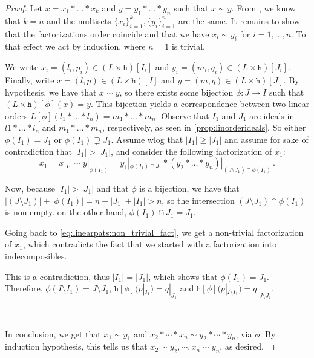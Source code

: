 \documentclass[12pt, reqno]{amsart}
\theoremstyle{definition}
\begin{document}
\begin{proof}
Let $x = x_1 \ast \dots \ast x_k $ and $ y =  y_1 \ast \dots \ast y_n$ such that $x \sim y$.
From \cite[Corollary 3.4.]{Penaguiao2020}, we know that $k = n$ and the multisets $\{x_i\}_{i=1}^k,  \{y_i\}_{i=1}^n$ are the same.
It remains to show that the factorizations order coincide and that we have $x_i \sim y_i$ for $i = 1, \dots , n$.
To that effect we act by induction, where $n = 1$ is trivial.


We write $x_i = (l_i, p_i)\in (L\times \mathtt{h})[I_i]$ and $y_i = (m_i, q_i)\in (L\times \mathtt{h})[J_i]$.
Finally, write $x = (l, p) \in (L\times \mathtt{h})[I] $ and $y = (m, q) \in (L\times \mathtt{h})[J]$.
By hypothesis, we have that $x \sim y$, so there exists some bijection $\phi: J \to I$ such that $ (L\times \mathtt{h})[\phi](x) = y$.
This bijection yields a correspondence between two linear orders $L [\phi] (l_1 \ast \dots \ast l_n) = m_1\ast \dots \ast m_n $.
Observe that $I_1$ and $J_1$ are ideals in $l1\ast \dots \ast l_n$ and $m_1 \ast \dots \ast m_n$, respectively, as seen in \cref{prop:linorderideals}.
So either $\phi (I_1)= J_1 $ or $\phi (I_1)\supsetneq J_1 $.
Assume wlog that $|I_1 | \geq	 |J_1|$ and assume for sake of contradiction that $|I_1| > |J_1|$, and consider the following factorization of $x_1 $:
\begin{equation}\label{eq:linearpats:non_trivial_fact}
x_1 = x|_{I_1} \sim y|_{\phi(I_1)} = y_1|_{\phi(I_1) \cap J_1} \ast (y_2 \ast \dots \ast y_n)|_{(J\setminus J_1) \cap \phi(I_1)}\, . 
\end{equation}

Now, because $|I_1| > |J_1|$ and that $\phi $ is a bijection, we have that $| (J\setminus J_1) | + | \phi(I_1) | = n - |J_1| + |I_1| > n$, so the intersection $(J\setminus J_1) \cap \phi(I_1)$ is non-empty.
on the other hand, $\phi(I_1) \cap J_1 = J_1$.

Going back to \eqref{eq:linearpats:non_trivial_fact}, we get a non-trivial factorization of $x_1$, which contradicts the fact that we started with a factorization into indecomposibles.

This is a contradiction, thus $|I_1 | = |J_1|$, which shows that $\phi(I_1) = J_1$.
Therefore,  $\phi(I\setminus I_1) = J \setminus  J_1$, $ \mathtt{h}[\phi] (p|_{I_1}) = q|_{J_1} $ and $ \mathtt{h}[\phi] (p|_{I \setminus I_1}) = q|_{J \setminus J_1} $.

\

In conclusion, we get that $x_1 \sim y_1$ and $x_2 \ast \cdots \ast x_n \sim y_2 \ast \cdots \ast y_n$, via $\phi$.
By induction hypothesis, this tells us that $x_2 \sim y_2, \cdots , x_n \sim y_n$, as desired.
\end{proof}
\end{document}
